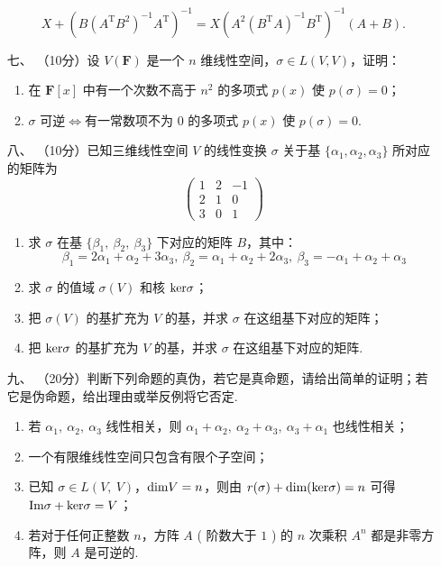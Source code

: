 \begin{enumerate}
    \[X+(B(A^\mathrm{T}B^2)^{-1}A^\mathrm{T})^{-1}=X(A^2(B^\mathrm{T}A)^{-1}B^\mathrm{T})^{-1}(A+B).\]
	\item[七、]（10分）设 $V(\mathbf{F})$ 是一个 $n$ 维线性空间，$\sigma \in L(V,V)$，证明：
    \begin{enumerate}[label=(\arabic*)]
        \item 在 $\mathbf{F}[x]$ 中有一个次数不高于 $n^2$ 的多项式 $p(x)$ 使 $p(\sigma)=0$；
        \item $\sigma$ 可逆$\iff$有一常数项不为 $0$ 的多项式 $p(x)$ 使 $p(\sigma)=0$.
    \end{enumerate}
    \item[八、]（10分）已知三维线性空间 $V$ 的线性变换 $\sigma$ 关于基 $\{\alpha_1,\alpha_2,\alpha_3\}$ 所对应的矩阵为
    \[\begin{pmatrix}1 & 2 & -1 \\ 2 & 1 & 0 \\ 3 & 0 & 1\end{pmatrix}\]
    \begin{enumerate}[label=(\arabic*)]
        \item 求 $\sigma$ 在基 $\{\beta_1,\ \beta_2,\ \beta_3\}$ 下对应的矩阵 $B$，其中：
        \[\beta_1=2\alpha_1+\alpha_2+3\alpha_3,\ \beta_2=\alpha_1+\alpha_2+2\alpha_3,\ \beta_3=-\alpha_1+\alpha_2+\alpha_3\]
        \item 求 $\sigma$ 的值域 $\sigma(V)$ 和核 $\textup{ker}\sigma$；
        \item 把 $\sigma(V)$ 的基扩充为 $V$ 的基，并求 $\sigma$ 在这组基下对应的矩阵；
        \item 把 $\textup{ker}\sigma$ 的基扩充为 $V$ 的基，并求 $\sigma$ 在这组基下对应的矩阵.
    \end{enumerate}
	\item[九、]（20分）判断下列命题的真伪，若它是真命题，请给出简单的证明；若它是伪命题，给出理由或举反例将它否定.
    \begin{enumerate}[label=(\arabic*)]
        \item 若 $\alpha_1,\ \alpha_2,\ \alpha_3$ 线性相关，则 $\alpha_1+\alpha_2,\ \alpha_2+\alpha_3,\ \alpha_3+\alpha_1$ 也线性相关；
        \item 一个有限维线性空间只包含有限个子空间；
        \item 已知 $\sigma \in L(V,\ V)$，$\textup{dim}V=n$，则由 $r(\sigma)+\textup{dim(ker}\sigma)=n$ 可得$\textup{Im}\sigma+\textup{ker}\sigma=V$；
        \item 若对于任何正整数 $n$，方阵 $A$ ( 阶数大于 $1$ ) 的 $n$ 次乘积 $A^n$ 都是非零方阵，则 $A$ 是可逆的.
    \end{enumerate}
\end{enumerate}

\clearpage

